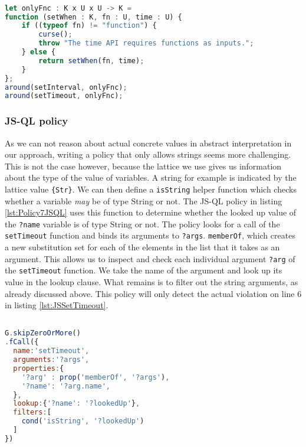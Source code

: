 \begin{lstlisting}[label={lst:Policy7Conscript},language=JavaScript,caption=Policy 7 in ConScript,mathescape=true]  % float=t?

let onlyFnc : K x U x U -> K =
function (setWhen : K, fn : U, time : U) {
    if ((typeof fn) != "function") {
        curse();
        throw "The time API requires functions as inputs.";
    } else {
        return setWhen(fn, time);
    }
};
around(setInterval, onlyFnc); 
around(setTimeout, onlyFnc);
\end{lstlisting}

\subsubsection*{JS-QL policy}
As we can not reason about actual concrete values in abstract interpretation in our approach, writing a policy that only allows strings seems more challenging. This is not the case however, because the lattice we use gives us information about the type of the value of variables. A string for example is indicated by the lattice value \texttt{\{Str\}}. We can then define a \texttt{isString} helper function which checks whether a variable \textit{may} be of type String or not. The JS-QL policy in listing \ref{lst:Policy7JSQL} uses this function to determine whether the looked up value of the \texttt{?name} variable is of type String or not. The policy looks for a call of the \texttt{setTimeout} function and binds its arguments to \texttt{?args}. \texttt{memberOf}, which creates a new substitution set for each of the elements in the list that it takes as an argument.
This allows us to inspect and check each individual argument \texttt{?arg} of the \texttt{setTimeout} function. We take the name of the argument and look up its value in the lookup clause. What remains is to filter out the string arguments, as already discussed above. This policy will only detect the actual violation on line 6 in listing \ref{lst:JSSetTimeout}.

\begin{lstlisting}[label={lst:Policy7JSQL},language=JavaScript,caption=Policy 7 in JS-QL,mathescape=true]  % float=t?

G.skipZeroOrMore()
.fCall({
  name:'setTimeout',
  arguments:'?args',
  properties:{
    '?arg' : prop('memberOf', '?args'),
    '?name': '?arg.name',
  },
  lookup:{'?name': '?lookedUp'},
  filters:[
    cond('isString', '?lookedUp')
  ]
})
\end{lstlisting}

